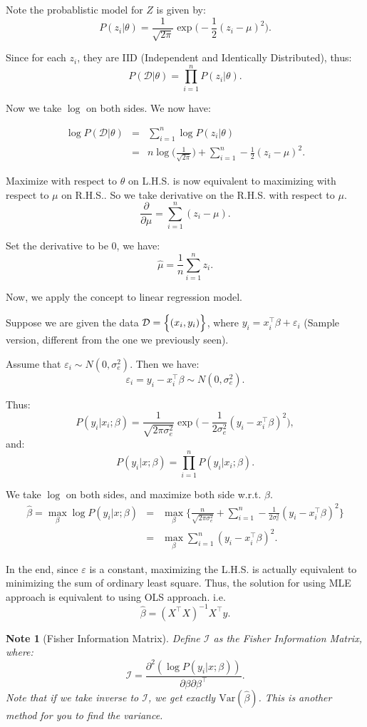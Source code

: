 \documentclass{article}
\theoremstyle{MyNonumberplain}
\theoremstyle{break}
\newcommand{\ve}{\varepsilon}
\newcommand{\var}{\text{Var}}
\newcommand{\T}{^\intercal}
\newcommand{\D}{\mathcal{D}}
\theoremstyle{break}
\newtheorem{note}{Note}
\begin{document}
Note the probablistic model for $Z$ is given by:
$$P(z_i|\theta)=\frac{1}{\sqrt{2\pi}}\exp\Biggl(-\frac{1}{2}(z_i-\mu)^2\Biggr).$$

Since for each $z_i$, they are IID (Independent and Identically Distributed), thus: 
$$P(\D|\theta)=\prod_{i=1}^n P(z_i|\theta).$$

Now we take $\log$ on both sides. We now have:

\begin{eqnarray*}
    \log P(\D|\theta)&=&\sum_{i=1}^n \log P(z_i|\theta)\\
                     &=&n\log\Biggl(\frac{1}{\sqrt{2\pi}}\Biggr) + \sum_{i=1}^n -\frac{1}{2}(z_i-\mu)^2.
\end{eqnarray*}

Maximize with respect to $\theta$ on L.H.S. is now equivalent to maximizing with respect to $\mu$ on R.H.S.. So we take derivative on the R.H.S. with respect to $\mu$.
$$\frac{\partial}{\partial\mu} =  \sum_{i=1}^n (z_i-\mu).$$

Set the derivative to be 0, we have:
$$\hat\mu=\frac{1}{n}\sum_{i=1}^n z_i.$$

Now, we apply the concept to linear regression model.

Suppose we are given the data $\D=\Bigl\{(x_i,y_i)\Bigr\}$, where $y_i=x_i\T\beta+\ve_i$ (Sample version, different from the one we previously seen).

Assume that $\ve_i\sim N(0,\sigma_e^2)$. Then we have:
$$\ve_i=y_i-x_i\T\beta\sim N(0,\sigma_e^2).$$

Thus:
$$P(y_i|x_i;\beta)=\frac{1}{\sqrt{2\pi\sigma_e^2}}\exp\Biggl(-\frac{1}{2\sigma_e^2}(y_i-x_i\T\beta)^2\Biggr),$$
and:
$$P(y_i|x;\beta)=\prod_{i=1}^{n}P(y_i|x_i;\beta).$$

We take $\log$ on both sides, and maximize both side w.r.t. $\beta$.
\begin{eqnarray*}
    \hat\beta=\max_\beta\log P(y_i|x;\beta)&=&\max_\beta\Biggl\{\frac{n}{\sqrt{2\pi\sigma_e^2}} + \sum_{i=1}^{n}-\frac{1}{2\sigma_e^2} (y_i-x_i\T\beta)^2\Biggr\}\\
    &=&\max_\beta\sum_{i=1}^{n} (y_i-x_i\T\beta)^2.
\end{eqnarray*}

In the end, since $\ve$ is a constant, maximizing the L.H.S. is actually equivalent to minimizing the sum of ordinary least square.
Thus, the solution for using MLE approach is equivalent to using OLS approach. i.e. $$\hat\beta=(X\T X)^{-1}X\T y.$$

\begin{notebox}
    \begin{note}[Fisher Information Matrix]
        Define $\mathcal{I}$ as the Fisher Information Matrix, where: $$\mathcal{I}=\frac{\partial^2 (\log P(y_i|x;\beta))}{\partial\beta\partial\beta\T}.$$
        Note that if we take inverse to $\mathcal{I}$, we get exactly $\var(\hat\beta)$. This is another method for you to find the variance.
    \end{note}
\end{notebox}
\end{document}
